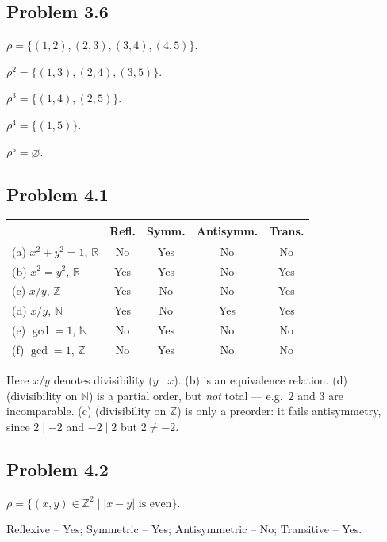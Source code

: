 \subsection*{Problem 3.6}

$\rho=\{(1,2),(2,3),(3,4),(4,5)\}$.

$\boxed{\rho^2=\{(1,3),(2,4),(3,5)\}}$.

$\boxed{\rho^3=\{(1,4),(2,5)\}}$.

$\boxed{\rho^4=\{(1,5)\}}$.

$\boxed{\rho^5=\varnothing}$.


\subsection*{Problem 4.1}

\begin{tabular}{l|cccc}
& Refl. & Symm. & Antisymm. & Trans. \\\hline
(a) $x^2+y^2=1$, $\mathbb{R}$ & No & Yes & No & No \\
(b) $x^2=y^2$, $\mathbb{R}$   & Yes & Yes & No & Yes \\
(c) $x/y$, $\mathbb{Z}$       & Yes & No  & No  & Yes \\
(d) $x/y$, $\mathbb{N}$       & Yes & No  & Yes & Yes \\
(e) $\gcd=1$, $\mathbb{N}$    & No  & Yes & No  & No \\
(f) $\gcd=1$, $\mathbb{Z}$    & No  & Yes & No  & No
\end{tabular}

\smallskip
Here $x/y$ denotes divisibility ($y\mid x$). (b) is an equivalence relation. (d) (divisibility on $\mathbb{N}$) is a partial order, but \emph{not} total --- e.g.\ $2$ and $3$ are incomparable. (c) (divisibility on $\mathbb{Z}$) is only a preorder: it fails antisymmetry, since $2\mid -2$ and $-2\mid 2$ but $2\ne -2$.


\subsection*{Problem 4.2}

$\rho=\{(x,y)\in\mathbb{Z}^2\mid |x-y|\text{ is even}\}$.

Reflexive -- Yes; Symmetric -- Yes; Antisymmetric -- No; Transitive -- Yes.

